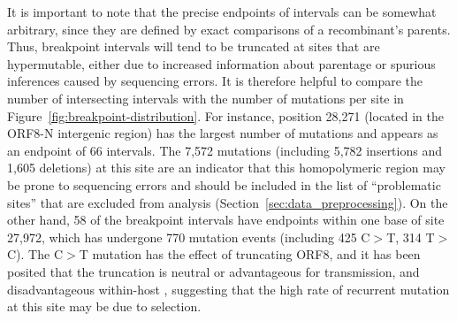 \documentclass{article}
\begin{document}
It is important to note that the precise endpoints of intervals can be
somewhat arbitrary, since they are defined by exact comparisons
of a recombinant's parents.
Thus, breakpoint intervals will tend to be truncated at sites that are
hypermutable, either due to increased information about parentage
or spurious inferences caused by sequencing errors.
It is therefore helpful to compare the number of intersecting intervals
with the number of mutations per site in Figure~\ref{fig:breakpoint-distribution}.
For instance, position 28,271 (located in the ORF8-N intergenic
region) has the largest number of mutations and appears as an endpoint
of 66 intervals.
The 7,572 mutations (including 5,782 insertions and 1,605 deletions)
at this site are an indicator that this
homopolymeric region may be prone to sequencing errors
and should be included in the list of ``problematic sites'' that
are excluded from analysis (Section~\ref{sec:data_preprocessing}).
On the other hand, 58 of the breakpoint intervals have endpoints
within one base of site 27,972, which has undergone 770 mutation events
(including 425 C$>$T, 314 T$>$C). The C$>$T mutation has the effect of
truncating ORF8, and it has been posited that the truncation is neutral
or advantageous for transmission, and disadvantageous within-host
\citep{Jungreis2021-dh}, suggesting that the high rate of recurrent mutation
at this site may be due to selection.

\end{document}

